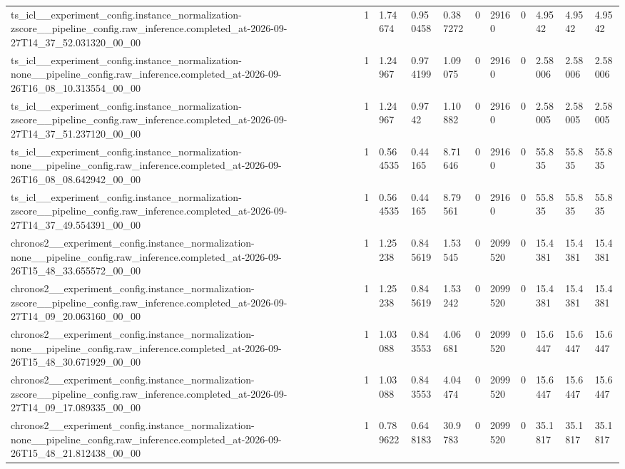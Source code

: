 \begin{tabular}{lllllllllll}
ts\_icl\_\_experiment\_config.instance\_normalization-zscore\_\_pipeline\_config.raw\_inference.completed\_at-2026-09-27T14\_37\_52.031320\_00\_00 & 1 & 1.74674 & 0.950458 & 0.387272 & 0 & 29160 & 0 & 4.9542 & 4.9542 & 4.9542 \\
ts\_icl\_\_experiment\_config.instance\_normalization-none\_\_pipeline\_config.raw\_inference.completed\_at-2026-09-26T16\_08\_10.313554\_00\_00 & 1 & 1.24967 & 0.974199 & 1.09075 & 0 & 29160 & 0 & 2.58006 & 2.58006 & 2.58006 \\
ts\_icl\_\_experiment\_config.instance\_normalization-zscore\_\_pipeline\_config.raw\_inference.completed\_at-2026-09-27T14\_37\_51.237120\_00\_00 & 1 & 1.24967 & 0.9742 & 1.10882 & 0 & 29160 & 0 & 2.58005 & 2.58005 & 2.58005 \\
ts\_icl\_\_experiment\_config.instance\_normalization-none\_\_pipeline\_config.raw\_inference.completed\_at-2026-09-26T16\_08\_08.642942\_00\_00 & 1 & 0.564535 & 0.44165 & 8.71646 & 0 & 29160 & 0 & 55.835 & 55.835 & 55.835 \\
ts\_icl\_\_experiment\_config.instance\_normalization-zscore\_\_pipeline\_config.raw\_inference.completed\_at-2026-09-27T14\_37\_49.554391\_00\_00 & 1 & 0.564535 & 0.44165 & 8.79561 & 0 & 29160 & 0 & 55.835 & 55.835 & 55.835 \\
chronos2\_\_experiment\_config.instance\_normalization-none\_\_pipeline\_config.raw\_inference.completed\_at-2026-09-26T15\_48\_33.655572\_00\_00 & 1 & 1.25238 & 0.845619 & 1.53545 & 0 & 2099520 & 0 & 15.4381 & 15.4381 & 15.4381 \\
chronos2\_\_experiment\_config.instance\_normalization-zscore\_\_pipeline\_config.raw\_inference.completed\_at-2026-09-27T14\_09\_20.063160\_00\_00 & 1 & 1.25238 & 0.845619 & 1.53242 & 0 & 2099520 & 0 & 15.4381 & 15.4381 & 15.4381 \\
chronos2\_\_experiment\_config.instance\_normalization-none\_\_pipeline\_config.raw\_inference.completed\_at-2026-09-26T15\_48\_30.671929\_00\_00 & 1 & 1.03088 & 0.843553 & 4.06681 & 0 & 2099520 & 0 & 15.6447 & 15.6447 & 15.6447 \\
chronos2\_\_experiment\_config.instance\_normalization-zscore\_\_pipeline\_config.raw\_inference.completed\_at-2026-09-27T14\_09\_17.089335\_00\_00 & 1 & 1.03088 & 0.843553 & 4.04474 & 0 & 2099520 & 0 & 15.6447 & 15.6447 & 15.6447 \\
chronos2\_\_experiment\_config.instance\_normalization-none\_\_pipeline\_config.raw\_inference.completed\_at-2026-09-26T15\_48\_21.812438\_00\_00 & 1 & 0.789622 & 0.648183 & 30.9783 & 0 & 2099520 & 0 & 35.1817 & 35.1817 & 35.1817 \\

\end{tabular}
